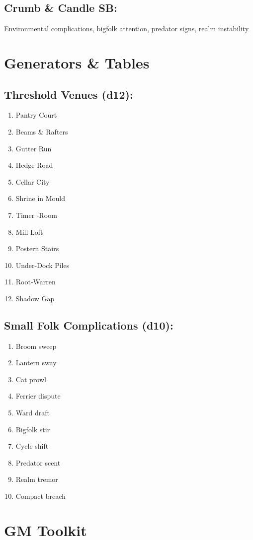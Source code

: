 \documentclass[11pt]{book}
\begin{document}
\subsection*{Crumb \& Candle SB:}
Environmental complications, bigfolk attention, predator signs, realm instability

\section{Generators \& Tables}
\subsection*{Threshold Venues (d12):}
\begin{enumerate}
\item Pantry Court  
\item Beams \& Rafters  
\item Gutter Run  
\item Hedge Road  
\item Cellar City  
\item Shrine in Mould
\item Timer -Room  
\item Mill-Loft  
\item Postern Stairs
\item Under-Dock Piles  
\item Root-Warren  
\item Shadow Gap
\end{enumerate}

\subsection*{Small Folk Complications (d10):}
\begin{enumerate}
\item Broom sweep  
\item Lantern sway  
\item Cat prowl  
\item Ferrier dispute  
\item Ward draft
\item Bigfolk stir  
\item Cycle shift  
\item Predator scent  
\item Realm tremor  
\item Compact breach
\end{enumerate}

\section{GM Toolkit}
\end{document}
